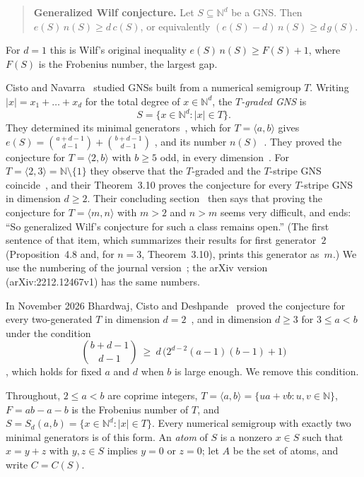 \documentclass[11pt]{article}
\theoremstyle{definition}
\theoremstyle{remark}
\newcommand{\N}{\mathbb N}
\begin{document}
\begin{quote}
\textbf{Generalized Wilf conjecture.} Let $S\subseteq\N^d$ be a GNS. Then
$e(S)\,n(S)\ge d\,c(S)$, or equivalently $(e(S)-d)\,n(S)\ge d\,g(S)$.
\end{quote}

\noindent For $d=1$ this is Wilf's original inequality $e(S)\,n(S)\ge F(S)+1$,
where $F(S)$ is the Frobenius number, the largest gap.

Cisto and Navarra~\cite{cn} studied GNSs built from a numerical semigroup $T$.
Writing $|x|=x_1+\dots+x_d$ for the total degree of $x\in\N^d$, the
\emph{$T$-graded GNS} is~\cite[Definition~4.1]{cn}
\[
S=\{x\in\N^d : |x|\in T\}.
\]
They determined its minimal generators~\cite[Theorem~4.3]{cn}, which for
$T=\langle a,b\rangle$ gives $e(S)=\binom{a+d-1}{d-1}+\binom{b+d-1}{d-1}$
\cite[Corollary~4.7]{cn}, and its number $n(S)$~\cite[Proposition~4.6]{cn}. They
proved the conjecture for $T=\langle 2,b\rangle$ with $b\ge5$ odd, in every
dimension~\cite[Proposition~4.8]{cn}. For $T=\langle2,3\rangle=\N\setminus\{1\}$
they observe that the $T$-graded and the $T$-stripe GNS
coincide~\cite[p.~166]{cn}, and their Theorem~3.10 proves the conjecture for
every $T$-stripe GNS in dimension $d\ge2$. Their concluding section~\cite[§6,
p.~172]{cn} then says that proving the conjecture for $T=\langle m,n\rangle$
with $m>2$ and $n>m$ seems very difficult, and ends: ``So generalized Wilf's
conjecture for such a class remains open.'' (The first sentence of that item, which summarizes their results for first
generator~$2$ (Proposition~4.8 and, for $n=3$, Theorem~3.10), prints this
generator as~$m$.) We use the numbering of the journal version~\cite{cn}; the arXiv
version (arXiv:2212.12467v1) has the same numbers.

In November 2026 Bhardwaj, Cisto and Deshpande~\cite{bcd} proved the conjecture
for every two-generated $T$ in dimension $d=2$~\cite[Theorem~5.5]{bcd}, and in
dimension $d\ge3$ for $3\le a<b$ under the condition
\begin{equation}\label{eq:bcd}
\binom{b+d-1}{d-1}\ \ge\ d\,\bigl(2^{d-2}(a-1)(b-1)+1\bigr)
\end{equation}
\cite[Theorem~5.6]{bcd}, which holds for fixed $a$ and $d$ when $b$ is large
enough. We remove this condition.

Throughout, $2\le a<b$ are coprime integers, $T=\langle a,b\rangle=\{ua+vb :
u,v\in\N\}$, $F=ab-a-b$ is the Frobenius number of $T$, and
$S=S_d(a,b)=\{x\in\N^d: |x|\in T\}$. Every numerical semigroup with exactly
two minimal generators is of this form. An \emph{atom} of $S$ is a nonzero
$x\in S$ such that $x=y+z$ with $y,z\in S$ implies $y=0$ or $z=0$; let $A$ be the
set of atoms, and write $C=C(S)$.
\end{document}
